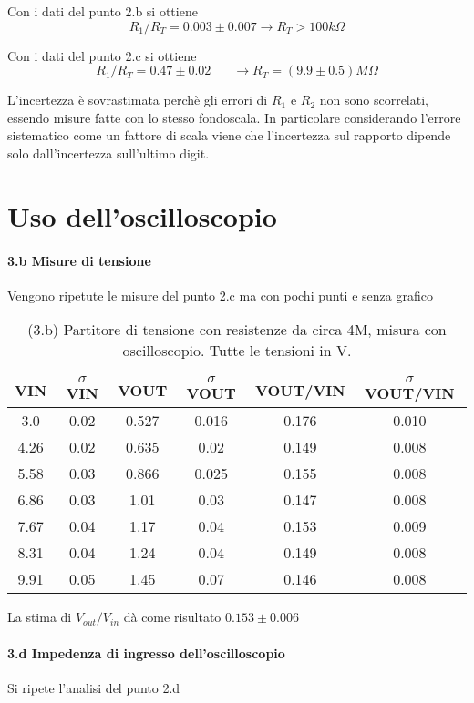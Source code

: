 \documentclass[10pt,a4paper]{article}
\newcommand{\exn}{\phantom{xxx}}
\begin{document}
Con i dati del punto 2.b si ottiene
\[ R_1/R_T = 0.003 \pm  0.007   \rightarrow  R_T > 100 k\Omega
\]


Con i dati del punto 2.c si ottiene
\[ R_1/R_T = 0.47  \pm0.02  \exn   \rightarrow  R_T = (9.9 \pm  0.5)  M\Omega
\]


L'incertezza è sovrastimata perchè gli errori di $R_1$ e $R_2$ non sono scorrelati, essendo misure fatte con lo stesso fondoscala. In particolare considerando l'errore sistematico come un fattore di scala viene che l'incertezza sul rapporto dipende solo dall'incertezza sull'ultimo digit.

\section{Uso dell'oscilloscopio}

\paragraph{3.b Misure di tensione} 
Vengono ripetute le misure del punto 2.c  ma con pochi punti e senza grafico
\begin{table}[h]
\centering
\begin{tabular}{|c|c|c|c|c|c|}
\hline 
VIN& $\sigma$ VIN  &VOUT	 & $\sigma$ VOUT& VOUT/VIN & $\sigma$ VOUT/VIN \\
\hline 

3.0 & 0.02 & 0.527 & 0.016 & 0.176 & 0.010 \\
4.26 & 0.02 & 0.635 & 0.02 & 0.149 & 0.008 \\
5.58 & 0.03 & 0.866 & 0.025 & 0.155 & 0.008 \\
6.86 & 0.03 & 1.01 & 0.03 & 0.147 & 0.008\\
7.67 & 0.04 & 1.17 & 0.04 & 0.153 & 0.009\\
8.31 & 0.04 & 1.24 & 0.04 & 0.149 & 0.008\\
9.91 & 0.05 & 1.45 & 0.07 & 0.146 & 0.008 \\
\hline 
\end{tabular} 
\caption{(3.b) Partitore di tensione con resistenze da circa 4M, misura con oscilloscopio. Tutte le tensioni in V.}
\end{table}

La stima di $V_{out}/{V_{in}}$ dà come risultato $0.153\pm0.006$



\paragraph{3.d Impedenza di ingresso dell'oscilloscopio} Si ripete l'analisi del punto 2.d
\end{document}
